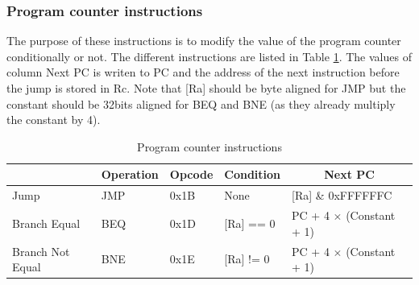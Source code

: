 \subsubsection*{Program counter instructions}

The purpose of these instructions is to modify the value of the program counter conditionally or 
not. The different instructions are listed in Table \ref{tab:instruction/pc}. The values of 
column Next PC is writen to PC and the address of the next instruction before the jump is
stored in Rc. Note that [Ra] should be byte aligned for JMP but the constant should be 32bits 
aligned for BEQ and BNE (as they already multiply the constant by 4).

\begin{table}[H]
    \centering
    \begin{tabular}{|l|l|l|l|l|}
    \hline
    \rowcolor[HTML]{DAE8FC} 
    \multicolumn{1}{|c|}{\cellcolor[HTML]{DAE8FC}\textbf{Name}} & \multicolumn{1}{c|}{\cellcolor[HTML]{DAE8FC}\textbf{Operation}} & \multicolumn{1}{c|}{\cellcolor[HTML]{DAE8FC}\textbf{Opcode}} & \multicolumn{1}{c|}{\cellcolor[HTML]{DAE8FC}\textbf{Condition}} & \multicolumn{1}{c|}{\cellcolor[HTML]{DAE8FC}\textbf{Next PC}} \\ \hline
    Jump                                                        & JMP                                                             & 0x1B                                                         & None                                                                 & {[}Ra{]} \& 0xFFFFFFC                                         \\ \hline
    Branch Equal                                                & BEQ                                                             & 0x1D                                                         & {[}Ra{]} == 0                                                        & PC + 4 $\times$ (Constant + 1)             \\ \hline
    Branch Not Equal                                            & BNE                                                             & 0x1E                                                         & {[}Ra{]} != 0                                                        & PC + 4 $\times$ (Constant + 1)                \\ \hline
    \end{tabular}
    \caption{Program counter instructions}
    \label{tab:instruction/pc}
\end{table}

